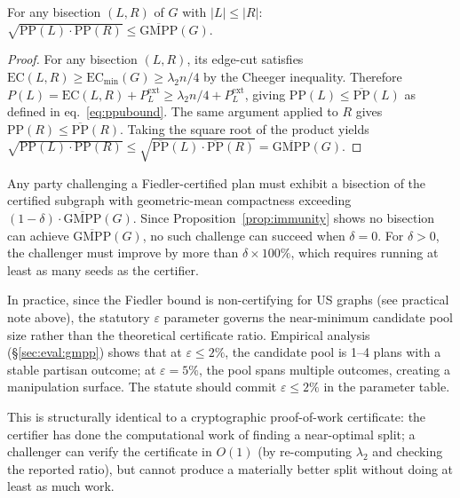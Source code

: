 \begin{proposition}
\label{prop:immunity}
For any bisection $(L, R)$ of $G$ with $|L| \leq |R|$:
$\sqrt{\mathrm{PP}(L) \cdot \mathrm{PP}(R)} \leq \overline{\mathrm{GMPP}}(G)$.
\end{proposition}
\begin{proof}
For any bisection $(L,R)$, its edge-cut satisfies
$\mathrm{EC}(L,R) \geq \mathrm{EC}_{\min}(G) \geq \lambda_2 n / 4$ by the
Cheeger inequality.  Therefore $P(L) = \mathrm{EC}(L,R) + P_L^{\mathrm{ext}}
\geq \lambda_2 n/4 + P_L^{\mathrm{ext}}$, giving
$\mathrm{PP}(L) \leq \overline{\mathrm{PP}}(L)$ as defined in
eq.~\eqref{eq:ppubound}.  The same argument applied to $R$ gives
$\mathrm{PP}(R) \leq \overline{\mathrm{PP}}(R)$.  Taking the square root of
the product yields
$\sqrt{\mathrm{PP}(L)\cdot\mathrm{PP}(R)} \leq
\sqrt{\overline{\mathrm{PP}}(L)\cdot\overline{\mathrm{PP}}(R)} =
\overline{\mathrm{GMPP}}(G)$.
\end{proof}
\begin{corollary}
Any party challenging a Fiedler-certified plan must exhibit a bisection of
the certified subgraph with geometric-mean compactness exceeding
$(1-\delta)\cdot\overline{\mathrm{GMPP}}(G)$.
Since Proposition~\ref{prop:immunity} shows no bisection can achieve
$\overline{\mathrm{GMPP}}(G)$, no such challenge can succeed when $\delta=0$.
For $\delta > 0$, the challenger must improve by more than $\delta \times 100\%$,
which requires running at least as many seeds as the certifier.
\end{corollary}

In practice, since the Fiedler bound is non-certifying for US graphs (see
practical note above), the statutory $\varepsilon$ parameter governs the
near-minimum candidate pool size rather than the theoretical certificate ratio.
Empirical analysis (\S\ref{sec:eval:gmpp}) shows that at $\varepsilon \leq 2\%$,
the candidate pool is 1--4 plans with a stable partisan outcome; at $\varepsilon
= 5\%$, the pool spans multiple outcomes, creating a manipulation surface.
The statute should commit $\varepsilon \leq 2\%$ in the parameter table.

This is structurally identical to a cryptographic proof-of-work certificate:
the certifier has done the computational work of finding a near-optimal split;
a challenger can verify the certificate in $O(1)$ (by re-computing $\lambda_2$
and checking the reported ratio), but cannot produce a materially better split
without doing at least as much work.

